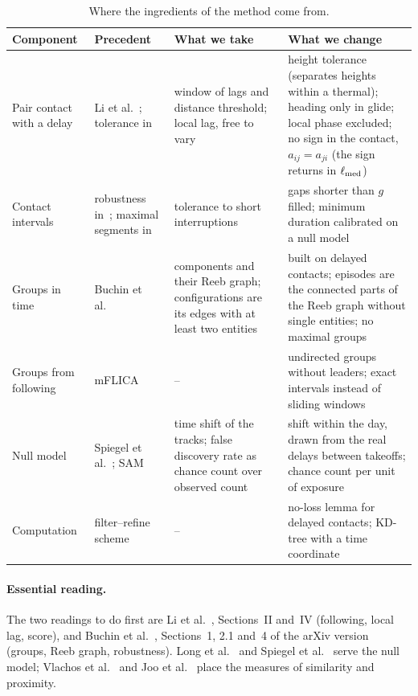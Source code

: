 \begin{table}
\centering
\small
\begin{tabularx}{\textwidth}{@{}>{\raggedright}p{2.1cm} >{\raggedright}p{2.6cm} >{\raggedright}X >{\raggedright\arraybackslash}X@{}}
\toprule
Component & Precedent & What we take & What we change \\
\midrule
Pair contact with a delay & Li et al.~\cite{li2013}; tolerance in~\cite{vlachos2002,chen2005,sakoe1978} &
  window of lags and distance threshold; local lag, free to vary &
  height tolerance (separates heights within a thermal); heading only in glide; local phase
  excluded; no sign in the contact, $a_{ij}=a_{ji}$ (the sign returns in $\ell_{\rm med}$) \\ \addlinespace
Contact intervals & robustness in~\cite{buchin2015}; maximal segments in~\cite{li2013} &
  tolerance to short interruptions &
  gaps shorter than $g$ filled; minimum duration calibrated on a null model \\ \addlinespace
Groups in time & Buchin et al.~\cite{buchin2015} & components and their Reeb graph; configurations
  are its edges with at least two entities &
  built on delayed contacts; episodes are the connected parts of the Reeb graph without single
  entities; no maximal groups \\ \addlinespace
Groups from following & mFLICA~\cite{amornbunchornvej2021} & -- &
  undirected groups without leaders; exact intervals instead of sliding windows \\ \addlinespace
Null model & Spiegel et al.~\cite{spiegel2016}; SAM~\cite{tusher2001} & time shift of the tracks;
  false discovery rate as chance count over observed count &
  shift within the day, drawn from the real delays between takeoffs; chance count per unit of
  exposure \\ \addlinespace
Computation & filter--refine scheme & -- &
  no-loss lemma for delayed contacts; KD-tree with a time coordinate \\
\bottomrule
\end{tabularx}
\caption{Where the ingredients of the method come from.}
\label{tab:origin}
\end{table}

\paragraph{Essential reading.} The two readings to do first are Li et al.~\cite{li2013},
Sections~II and~IV (following, local lag, score), and Buchin et al.~\cite{buchin2015}, Sections~1,
2.1 and~4 of the arXiv version (groups, Reeb graph, robustness). Long et al.~\cite{long2014} and
Spiegel et al.~\cite{spiegel2016} serve the null model; Vlachos et al.~\cite{vlachos2002} and Joo
et al.~\cite{joo2018} place the measures of similarity and proximity.
